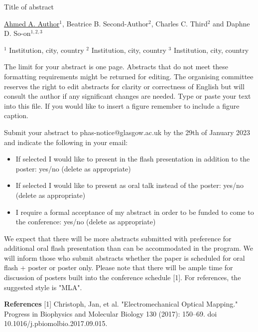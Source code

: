 \documentclass[openany, parskip=full, 12pt, a4]{scrbook}
\begin{document}
\begin{abstract_online}{Title of abstract}{%
        
        \underline{Ahmed A. Author}$^{1}$, Beatrice B. Second-Author$^{2}$, Charles C. Third$^{2}$ and Daphne D. So-on$^{1,2,3}$}{%
        }{%
        $^1$ Institution, city, country
        \newline{}$^2$ Institution, city, country
        \newline{}$^3$ Institution, city, country}
        
The limit for your abstract is one page. Abstracts that do not meet these formatting requirements might be returned for editing. The organising committee reserves the right to edit abstracts for clarity or correctness of English but will consult the author if any significant changes are needed. Type or paste your text into this file. If you would like to insert a figure remember to include a figure caption.

Submit your abstract to phas-notice@glasgow.ac.uk by the 29th of January 2023 and indicate the following in your email: 

\begin{itemize}
\item	If selected I would like to present in the flash presentation in addition to the poster: yes/no (delete as appropriate)
\item	If selected I would like to present as oral talk instead of the poster: yes/no (delete as appropriate) 
\item	I require a formal acceptance of my abstract in order to be funded to come to the conference: yes/no (delete as appropriate)
\end{itemize}
  
We expect that there will be more abstracts submitted with preference for additional oral flash presentation than can be accommodated in the program. We will inform those who submit abstracts whether the paper is scheduled for oral flash + poster or poster only.  Please note that there will be ample time for discussion of posters built into the conference schedule [1]. For references, the suggested style is "MLA".

    
\textbf{References} %
\newline{}[1] Christoph, Jan, et al. "Electromechanical Optical Mapping." Progress in Biophysics and Molecular Biology 130 (2017): 150–69. 
doi 10.1016/j.pbiomolbio.2017.09.015.

\end{abstract_online}
\end{document}
